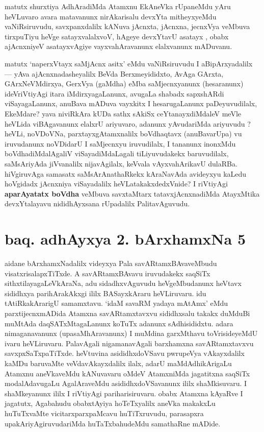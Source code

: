 \begin{artha}
matutx shurxtiya AdhAradiMda Atamxnu EkAneVka rUpaneMdu yAru heVLuvaro avara 
matavanunx nirAkarisalu devxYta mitheyxyeMdu vaNiRsiruvudu, savxpanxdalilx 
kANuva jAcnxta, jAcnxna, jecnxVya veMbuva tirxpuTiyu heVge satayxvalalxvoV, 
hAgeye devxYtavU asatayx , obabx ajAcnxniyeV asatayxvAgiye  vayxvahAravanunx 
elalxvanunx mADuvanu. 

matutx `naperxVtayx saMjAcnx asitx' eMdu vaNiRsiruvudu I aBipArxyadalilx {\rm  {\rm ---} }  yAva ajAcnxnadasheyalilx 
BeVda Berxmeyididxto, AvAga GArxta, GArxNeVMdirxya, GerxVya (gaMdha) eMba 
saMjecnxyanunx (hesaranunx) ideVriVtiyAgi itara iMdirxyagaLanunx, avugaLa 
shabadx sapxshARdi viSayagaLanunx, anuBava mADuva vayxkitx I hesarugaLanunx paDeyuvu\-dilalx,
EkeMdare? yava niviRkAra kUDa sathx sAkiSx ceYtanayxdiMdaleV meVle heVLida viBAgavanunx 
elalxrU ariyuvaro, adanunx yAvudariMda ariyuvudu ? heVLi, noVDoVNa, parxtayxgAtamxnalilx 
boVdhaqtavx (anuBavarUpa) vu iruvudanunx  noVDidarU I saMjecnxyu iruvudilalx, I tananunx 
inonxMdu boVdhadiMdalAgaliV viSayadiMdaLagali tiLiyuvudakekx baruvudilalx, saMsAriyAda 
jiVvanalilx nijavAgilalx, keVvala vAyxvahArikavU dulaRBa. hiVgiruvAga samasatx 
saMsArAnathaRkekx kAraNavAda avideyxyu kaLedu hoVgidadx jAcnxniya viSayadalilx 
heVLatakakxdedxVnide? I riVtiyAgi \textbf{aparAyatatx boVdha} veMbuva savxtaMtarx 
tatavxjAcnxnadiMda AtayxMtika devxYtalayavu nididhAyxsana rUpadalilx PalitavAguvudu.
\end{artha}

\section*{baq. adhAyxya 2. bArxhamxNa 5}

\begin{center}
\end{center}

\begin{artha}
aidane bArxhamxNadalilx videyxya Pala savARtamxBAvaveMbudu visatxrisalapxTiTxde. \-A savARtamxBAvavu iruvudakekx saqSiTx sithxtilayagaLeVkAraNa, adu sidadhxvAguvudu heVgeMbudanunx heVtavx sididhxya parihArakAkxgi ililx BASayxkAraru heVLiruvaru. idu tAtiRkakArarigU samamxtavu. `idaM savaRM yadaya mAtAmx' eMdu parxtijecnx\-mADida Atamxna savARtamxtavxvu sididhxsalu takakx duMduBi muMtAda daqSATxMtagaLanunx koTuTx adanunx sAdhisididxtu. adara nimaganavanunx (upasaMhAravanunx) I muMdina garxMthavu toVrisideyeMdU ivaru heVLiruvaru. PalavAgali nigamanavAgali barxhamxna savARtamxtavxvu savxpxSaTxpaTiTxde. heVtuvina asididhxdoVSavu pwrupeVya vAkayxdalilx kaMDu baruvaMte veVdavAkayxdalilx ilalx, adarU maMdAdhikArigaLu Atamxnu aneVkaveMdu kANuvavaru oMdeV AtamxniMda jagatitxna saqSiTx modalAdavugaLu AgalAraveMdu asididhxdoVSavanunx ililx shaMkisuvaru. I shaMkeyanunx ililx I riVtiyAgi pariharisiruvaru. obabx Atamxna kAyaRve I jagatutx, Agabahudu obabxtAyiya hoTeTxyalilx aneVka makakxLu huTuTxvaMte vicitarxparxpaMcavu huTiTxruvudu, parasapxra upakAriyAgiruvudariMda huTaTxbahudeMdu samathaRne mADide.
\end{artha}

